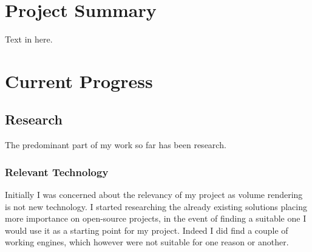 \documentclass[11pt,fleqn,twoside]{article}
\begin{document}

\mmp

\setcounter{tocdepth}{3} %
\tableofcontents

\newpage

\section{Project Summary}
Text in here.

\section{Current Progress}


\subsection{Research}
The predominant part of my work so far has been research.

\subsubsection{Relevant Technology}
Initially I was concerned about the relevancy of my project as volume rendering is not new technology. I started researching the already existing solutions placing more importance on open-source projects, in the event of finding a suitable one I would use it as a starting point for my project. Indeed I did find a couple of working engines, which however were not suitable for one reason or another.
\end{document}
